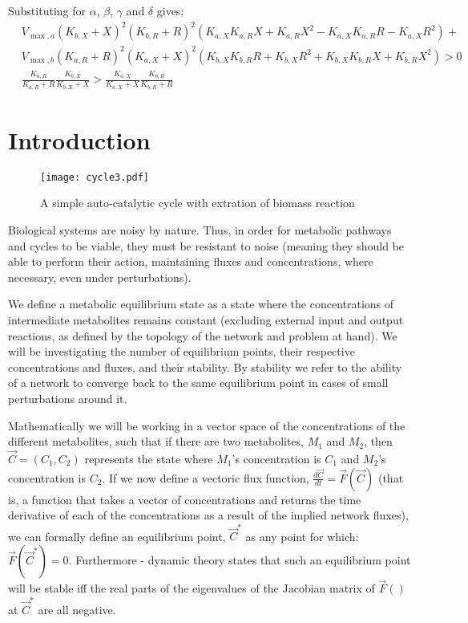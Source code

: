 \documentclass[a4page,notitlepage]{article}
\begin{document}
  Substituting for $\alpha$, $\beta$, $\gamma$ and $\delta$ gives:
  $$
  \begin{aligned}
      &
       V_{\max,a}(K_{b,X}+X)^2(K_{b,R}+R)^2 (K_{a,X}K_{a,R}X+K_{a,R}X^2-K_{a,X}K_{a,R}R-K_{a,X}R^2)+\\
       &
       V_{\max,b}(K_{a,R}+R)^2(K_{a,X}+X)^2 (K_{b,X}K_{b,R}R+K_{b,X}R^2+K_{b,X}K_{b,R}X+K_{b,R}X^2)>0 \\
      &\frac{K_{a,R}}{K_{a,R}+R}\frac{K_{b,X}}{K_{b,X}+X} >\frac{K_{a,X}}{K_{a,X}+X}\frac{K_{b,R}}{K_{b,R}+R}
  \end{aligned}
  $$

\section{Introduction}
\begin{figure}[h]
\centering
\texttt{[image: cycle3.pdf]}
\caption{A simple auto-catalytic cycle with extration of biomass reaction}
\end{figure}
Biological systems are noisy by nature.
Thus, in order for metabolic pathways and cycles to be viable, they must be resistant to noise (meaning they should be able to perform their action, maintaining fluxes and concentrations, where necessary, even under perturbations).

We define a metabolic equilibrium state as a state where the concentrations of intermediate metabolites remains constant (excluding external input and output reactions, as defined by the topology of the network and problem at hand).
We will be investigating the number of equilibrium points, their respective concentrations and fluxes, and their stability.
By stability we refer to the ability of a network to converge back to the same equilibrium point in cases of small perturbations around it.

Mathematically we will be working in a vector space of the concentrations of the different metabolites, such that if there are two metabolites, $M_1$ and $M_2$, then $\vec{C}=(C_1,C_2)$ represents the state where $M_1$'s concentration is $C_1$ and $M_2$'s concentration is $C_2$.
If we now define a vectoric flux function, $\frac{d\vec{C}}{dt}=\vec{F}(\vec{C})$ (that is, a function that takes a vector of concentrations and returns the time derivative of each of the concentrations as a result of the implied network fluxes), we can formally define an equilibrium point, $\vec{C}^*$ as any point for which: $\vec{F}(\vec{C}^*)=0$.
Furthermore - dynamic theory states that such an equilibrium point will be stable iff the real parts of the eigenvalues of the Jacobian matrix of $\vec{F}()$ at $\vec{C}^*$ are all negative.
\end{document}
